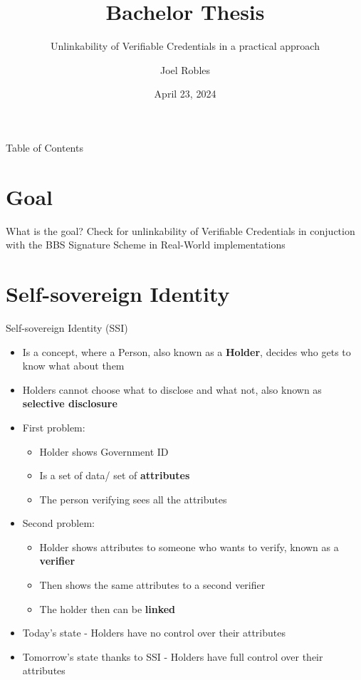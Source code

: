 \documentclass[
	english,%
	authorontitle=true,
	]{bfhbeamer}
\title{Bachelor Thesis}
\subtitle{Unlinkability of Verifiable Credentials in a practical approach}
\author[J. Robles]{Joel Robles}
\institute{TI}
\date{April 23, 2024}
\begin{document}
\maketitle

\begin{frame}{Table of Contents}
    \tableofcontents
\end{frame}

\section{Goal}

\begin{frame}{What is the goal?}
    \centering
    Check for unlinkability of Verifiable Credentials in conjuction with the BBS Signature Scheme in Real-World implementations
\end{frame}

\section{Self-sovereign Identity}

\begin{frame}{Self-sovereign Identity (SSI)}
    \begin{itemize}
        \item Is a concept, where a Person, also known as a \textbf{Holder}, decides who gets to know what about them
        \item Holders cannot choose what to disclose and what not, also known as \textbf{selective disclosure}
        \item First problem: 
        \begin{itemize}
            \item Holder shows Government ID
            \item Is a set of data/ set of \textbf{attributes}
            \item The person verifying sees all the attributes
        \end{itemize}
        \item Second problem:
        \begin{itemize}
            \item Holder shows attributes to someone who wants to verify, known as a \textbf{verifier}
            \item Then shows the same attributes to a second verifier
            \item The holder then can be \textbf{linked}
        \end{itemize}
        \item Today's state - Holders have no control over their attributes
        \item Tomorrow's state thanks to SSI - Holders have full control over their attributes
    \end{itemize}
\end{frame}
\end{document}
